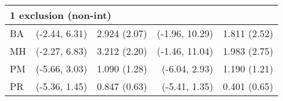 \begin{table}[t]
\begin{tabular}{lrrrr}
\midrule
\multicolumn{5}{l}{1 exclusion (non-int)} \\ 
\midrule
\hspace{11.25pt} BA & (-2.44, 6.31) & 2.924 (2.07) & (-1.96, 10.29) & 1.811 (2.52) \\ 
\hspace{11.25pt} MH & (-2.27, 6.83) & 3.212 (2.20) & (-1.46, 11.04) & 1.983 (2.75) \\ 
\hspace{11.25pt} PM & (-5.66, 3.03) & 1.090 (1.28) & (-6.04, 2.93) & 1.190 (1.21) \\ 
\hspace{11.25pt} PR & (-5.36, 1.45) & 0.847 (0.63) & (-5.41, 1.35) & 0.401 (0.65) \\ 
\bottomrule
\end{tabular}
\end{table}

